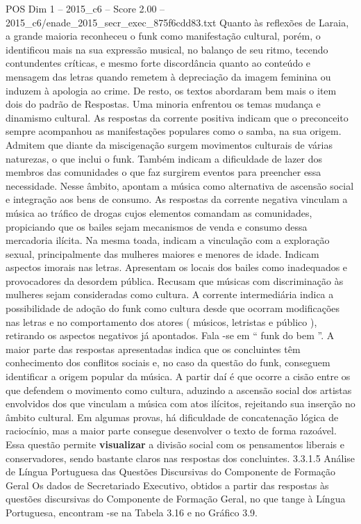 \begin{textsample}{POS Dim 1 – 2015\_c6 – Score 2.00 – 2015\_c6/enade\_2015\_secr\_exec\_875f6cdd83.txt}
Quanto às reflexões de Laraia, a grande maioria reconheceu o funk como manifestação cultural, porém, o identificou mais na sua expressão musical, no balanço de seu ritmo, tecendo contundentes críticas, e mesmo forte discordância quanto ao conteúdo e mensagem das letras quando remetem à depreciação da imagem feminina ou induzem à apologia ao crime.
De resto, os textos abordaram bem mais o item dois do padrão de Respostas.
Uma minoria enfrentou os temas mudança e dinamismo cultural.
As respostas da corrente positiva indicam que o preconceito sempre acompanhou as manifestações populares como o samba, na sua origem.
Admitem que diante da miscigenação surgem movimentos culturais de várias naturezas, o que inclui o funk.
Também indicam a dificuldade de lazer dos membros das comunidades o que faz surgirem eventos para preencher essa necessidade.
Nesse âmbito, apontam a música como alternativa de ascensão social e integração aos bens de consumo.
As respostas da corrente negativa vinculam a música ao tráfico de drogas cujos elementos comandam as comunidades, propiciando que os bailes sejam mecanismos de venda e consumo dessa mercadoria ilícita.
Na mesma toada, indicam a vinculação com a exploração sexual, principalmente das mulheres maiores e menores de idade.
Indicam aspectos imorais nas letras.
Apresentam os locais dos bailes como inadequados e provocadores da desordem pública.
Recusam que músicas com discriminação às mulheres sejam consideradas como cultura.
A corrente intermediária indica a possibilidade de adoção do funk como cultura desde que ocorram modificações nas letras e no comportamento dos atores ( músicos, letristas e público ), retirando os aspectos negativos já apontados.
Fala -se em “ funk do bem ”.
A maior parte das respostas apresentadas indica que os concluintes têm conhecimento dos conflitos sociais e, no caso da questão do funk, conseguem identificar a origem popular da música.
A partir daí é que ocorre a cisão entre os que defendem o movimento como cultura, aduzindo a ascensão social dos artistas envolvidos dos que vinculam a música com atos ilícitos, rejeitando sua inserção no âmbito cultural.
Em algumas provas, há dificuldade de concatenação lógica de raciocínio, mas a maior parte consegue desenvolver o texto de forma razoável.
Essa questão permite \textbf{visualizar} a divisão social com os pensamentos liberais e conservadores, sendo bastante claros nas respostas dos concluintes. 3.3.1.5 Análise de Língua Portuguesa das Questões Discursivas do Componente de Formação Geral Os dados de Secretariado Executivo, obtidos a partir das respostas às questões discursivas do Componente de Formação Geral, no que tange à Língua Portuguesa, encontram -se na Tabela 3.16 e no Gráfico 3.9.

\end{textsample}
